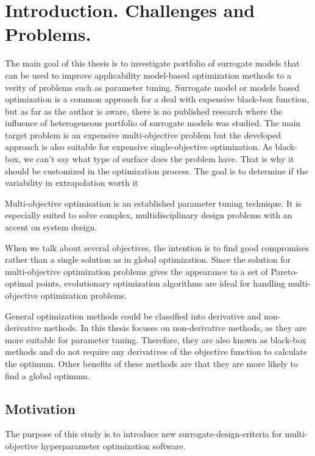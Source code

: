 \chapter{Introduction. Challenges and Problems.}

The main goal of this thesis is to investigate portfolio of surrogate models that can be used to improve applicability model-based optimization methods to a verity of problems such as parameter tuning. Surrogate model or models based optimization is a common approach for a deal with expensive black-box function, but as far as the author is aware, there is no published research where the influence of heterogeneous portfolio of surrogate models was studied. The main target problem is an expensive multi-objective problem but the developed approach is also suitable for expensive single-objective optimization.
As black-box, we can't say what type of surface does the problem have. That is why it should be customized in the optimization process. The goal is to determine if the variability in extrapolation worth it



Multi-objective optimisation is an established parameter tuning technique. It is especially suited to solve complex, multidisciplinary design problems with an accent on system design.

When we talk about several objectives, the intention is to find good compromises rather than a single solution as in global optimization.
Since the solution for multi-objective optimization problems gives the appearance to a set of Pareto-optimal points, evolutionary optimization algorithms are ideal for handling multi-objective optimization problems.

General optimization methods could be classified into derivative and non-derivative methods. In this thesis focuses on non-derivative methods, as they are more suitable for parameter tuning. Therefore, they are also known as black-box methods and do not require any derivatives of the objective function to calculate the optimum.  Other benefits of these methods are that they are more likely to find a global optimum. 

\section{Motivation}
    The purpose of this study is to introduce new surrogate-design-criteria for multi-objective hyperparameter optimization software.

